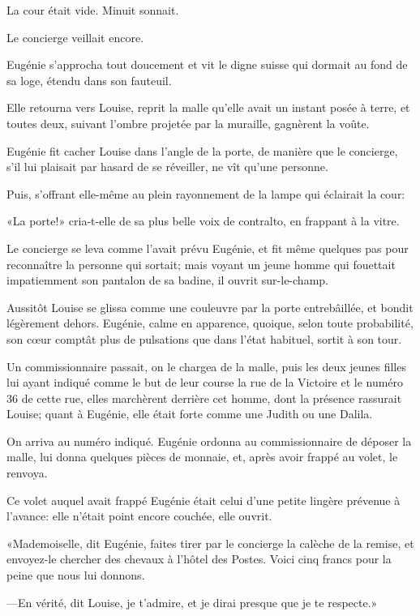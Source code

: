 La cour était vide. Minuit sonnait. 

Le concierge veillait encore. 

Eugénie s'approcha tout doucement et vit le digne suisse qui dormait au fond de sa loge, étendu dans son fauteuil. 

Elle retourna vers Louise, reprit la malle qu'elle avait un instant posée à terre, et toutes deux, suivant l'ombre projetée par la muraille, gagnèrent la voûte. 

Eugénie fit cacher Louise dans l'angle de la porte, de manière que le concierge, s'il lui plaisait par hasard de se réveiller, ne vît qu'une personne. 

Puis, s'offrant elle-même au plein rayonnement de la lampe qui éclairait la cour: 

«La porte!» cria-t-elle de sa plus belle voix de contralto, en frappant à la vitre. 

Le concierge se leva comme l'avait prévu Eugénie, et fit même quelques pas pour reconnaître la personne qui sortait; mais voyant un jeune homme qui fouettait impatiemment son pantalon de sa badine, il ouvrit sur-le-champ. 

Aussitôt Louise se glissa comme une couleuvre par la porte entrebâillée, et bondit légèrement dehors. Eugénie, calme en apparence, quoique, selon toute probabilité, son cœur comptât plus de pulsations que dans l'état habituel, sortit à son tour. 

Un commissionnaire passait, on le chargea de la malle, puis les deux jeunes filles lui ayant indiqué comme le but de leur course la rue de la Victoire et le numéro 36 de cette rue, elles marchèrent derrière cet homme, dont la présence rassurait Louise; quant à Eugénie, elle était forte comme une Judith ou une Dalila. 

On arriva au numéro indiqué. Eugénie ordonna au commissionnaire de déposer la malle, lui donna quelques pièces de monnaie, et, après avoir frappé au volet, le renvoya. 

Ce volet auquel avait frappé Eugénie était celui d'une petite lingère prévenue à l'avance: elle n'était point encore couchée, elle ouvrit. 

«Mademoiselle, dit Eugénie, faites tirer par le concierge la calèche de la remise, et envoyez-le chercher des chevaux à l'hôtel des Postes. Voici cinq francs pour la peine que nous lui donnons. 

—En vérité, dit Louise, je t'admire, et je dirai presque que je te respecte.» 

